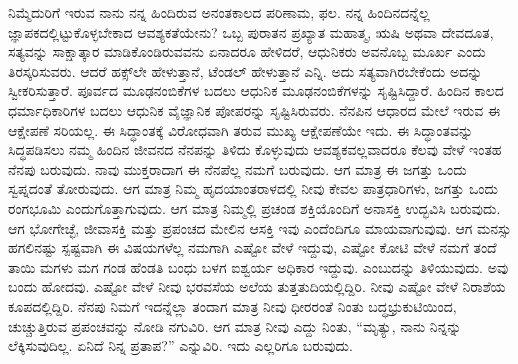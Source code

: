 ನಿಮ್ಮೆದುರಿಗೆ ಇರುವ ನಾನು ನನ್ನ ಹಿಂದಿರುವ ಅನಂತಕಾಲದ ಪರಿಣಾಮ, ಫಲ. ನನ್ನ ಹಿಂದಿನದನ್ನೆಲ್ಲ ಜ್ಞಾಪಕದಲ್ಲಿಟ್ಟುಕೊಳ್ಳಬೇಕಾದ ಆವಶ್ಯಕತೆಯೇನು? ಒಬ್ಬ ಪುರಾತನ ಪ್ರಖ್ಯಾತ ಮಹಾತ್ಮ, ಋಷಿ ಅಥವಾ ದೇವದೂತ, ಸತ್ಯವನ್ನು ಸಾಕ್ಷಾತ್ಕಾರ ಮಾಡಿಕೊಂಡಿರುವವನು ಏನಾದರೂ ಹೇಳಿದರೆ, ಆಧುನಿಕರು ಅವನೊಬ್ಬ ಮೂರ್ಖ ಎಂದು ತಿರಸ್ಕರಿಸುವರು. ಆದರೆ ಹಕ್ಸ್​ಲೇ ಹೇಳುತ್ತಾನೆ, ಟೆಂಡಲ್​ ಹೇಳುತ್ತಾನೆ ಎನ್ನಿ. ಅದು ಸತ್ಯವಾಗಿರಬೇಕೆಂದು ಅದನ್ನು ಸ್ವೀಕರಿಸುತ್ತಾರೆ. ಪೂರ್ವದ ಮೂಢನಂಬಿಕೆಗಳ ಬದಲು ಆಧುನಿಕ ಮೂಢನಂಬಿಕೆಗಳನ್ನು ಸೃಷ್ಟಿಸಿದ್ದಾರೆ. ಹಿಂದಿನ ಕಾಲದ ಧರ್ಮಾಧಿಕಾರಿಗಳ ಬದಲು ಆಧುನಿಕ ವೈಜ್ಞಾನಿಕ ಪೋಪರನ್ನು ಸೃಷ್ಟಿಸಿರುವರು. ನೆನಪಿನ ಆಧಾರದ ಮೇಲೆ ಇರುವ ಈ ಆಕ್ಷೇಪಣೆ ಸರಿಯಲ್ಲ. ಈ ಸಿದ್ಧಾಂತಕ್ಕೆ ವಿರೋಧವಾಗಿ ತರುವ ಮುಖ್ಯ ಆಕ್ಷೇಪಣೆಯೇ ಇದು. ಈ ಸಿದ್ಧಾಂತವನ್ನು ಸಿದ್ಧಪಡಿಸಲು ನಮ್ಮ ಹಿಂದಿನ ಜೀವನದ ನೆನಪನ್ನು ತಿಳಿದು ಕೊಳ್ಳುವುದು ಆವಶ್ಯಕವಲ್ಲವಾದರೂ ಕೆಲವು ವೇಳೆ ಇಂತಹ ನೆನಪು ಬರುವುದು. ನಾವು ಮುಕ್ತರಾದಾಗ ಈ ನೆನಪೆಲ್ಲ ನಮಗೆ ಬರುವುದು. ಆಗ ಮಾತ್ರ ಈ ಜಗತ್ತು ಒಂದು ಸ್ವಪ್ನದಂತೆ ತೋರುವುದು. ಆಗ ಮಾತ್ರ ನಿಮ್ಮ ಹೃದಯಾಂತರಾಳದಲ್ಲಿ ನೀವು ಕೇವಲ ಪಾತ್ರಧಾರಿಗಳು, ಜಗತ್ತು ಒಂದು ರಂಗಭೂಮಿ ಎಂದುಗೊತ್ತಾಗುವುದು. ಆಗ ಮಾತ್ರ ನಿಮ್ಮಲ್ಲಿ ಪ್ರಚಂಡ ಶಕ್ತಿಯೊಂದಿಗೆ ಅನಾಸಕ್ತಿ ಉದ್ಭವಿಸಿ ಬರುವುದು. ಆಗ ಭೋಗೇಚ್ಛೆ, ಜೀವಾಸಕ್ತಿ ಮತ್ತು ಪ್ರಪಂಚದ ಮೇಲಿನ ಆಸಕ್ತಿ ಇವು ಎಂದೆಂದಿಗೂ ಮಾಯವಾಗುವುವು. ಆಗ ಮನಸ್ಸು ಹಗಲಿನಷ್ಟು ಸ್ಪಷ್ಟವಾಗಿ ಈ ವಿಷಯಗಳೆಲ್ಲ ನಮಗಾಗಿ ಎಷ್ಟೋ ವೇಳೆ ಇದ್ದುವು, ಎಷ್ಟೋ ಕೋಟಿ ವೇಳೆ ನಮಗೆ ತಂದೆ ತಾಯಿ ಮಗಳು ಮಗ ಗಂಡ ಹೆಂಡತಿ ಬಂಧು ಬಳಗ ಐಶ್ವರ್ಯ ಅಧಿಕಾರ ಇದ್ದುವು. ಎಂಬುದನ್ನು ತಿಳಿಯುವುದು. ಅವು ಬಂದು ಹೋದವು. ಎಷ್ಟೋ ವೇಳೆ ನೀವು ಭರವಸೆಯ ಅಲೆಯ ತುತ್ತತುದಿಯಲ್ಲಿದ್ದಿರಿ. ನೀವು ಎಷ್ಟೋ ವೇಳೆ ನಿರಾಶೆಯ ಕೂಪದಲ್ಲಿದ್ದಿರಿ. ನೆನಪು ನಿಮಗೆ ಇದನ್ನೆಲ್ಲಾ ತಂದಾಗ ಮಾತ್ರ ನೀವು ಧೀರರಂತೆ ನಿಂತು ಬದ್ಧಭ್ರುಕುಟಿಯಿಂದ, ಚುಚ್ಚುತ್ತಿರುವ ಪ್ರಪಂಚವನ್ನು ನೋಡಿ ನಗುವಿರಿ. ಆಗ ಮಾತ್ರ ನೀವು ಎದ್ದು ನಿಂತು, “ಮೃತ್ಯು, ನಾನು ನಿನ್ನನ್ನು ಲೆಕ್ಕಿಸುವುದಿಲ್ಲ. ಏನಿದೆ ನಿನ್ನ ಪ್ರತಾಪ?” ಎನ್ನುವಿರಿ. ಇದು ಎಲ್ಲರಿಗೂ ಬರುವುದು.

\vskip 0.2cm

